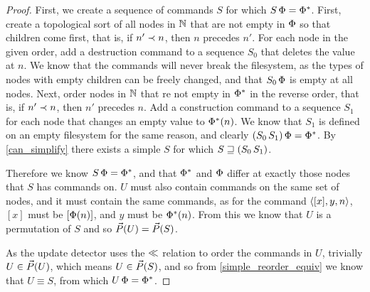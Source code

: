 \begin{proof}
First, we create a sequence of commands $S$ for which $S\,\Phi=\Phi^*$.
First, create a topological sort of all nodes in $\mathbb{N}$ that are
not empty in $\Phi$ so that children come first,
that is, if $n'\prec n$, then $n$ precedes $n'$.
For each node in the given order, add a destruction command to a sequence $S_0$
that deletes the value at $n$.
We know that the commands will never break the filesystem, as the types of nodes
with empty children can be freely changed, and that $S_0\,\Phi$ is empty at all nodes.
Next, order nodes in $\mathbb{N}$ that re not empty in $\Phi^*$ in the reverse order,
that is, if $n'\prec n$, then $n'$ precedes $n$.
Add a construction command to a sequence $S_1$ for each node that changes an empty value
to $\Phi^*(n)$.
We know that $S_1$ is defined on an empty filesystem for the same reason,
and clearly $(S_0\, S_1)\,\Phi=\Phi^*$.
By \cref{can_simplify} there exists a simple $S$ for which $S\sqsupseteq (S_0\, S_1)$.

Therefore we know $S\,\Phi=\Phi^*$, and that
$\Phi^*$ and $\Phi$ differ at exactly those nodes that $S$ has commands on.
$U$ must also contain commands on the same set of nodes,
and it must contain the same commands,
as for the command $\langle{[x],y,n}\rangle$, $[x]$ must be $[\Phi(n)]$, and $y$ must be $\Phi^*(n)$.
From this we know that $U$ is a permutation of $S$ and so $\vec{P}({U})=\vec{P}({S})$.

As the update detector uses the $\ll$ relation to order the commands in $U$, trivially $U\in\vec{P}({U})$,
which means $U\in\vec{P}({S})$,
and so from \cref{simple_reorder_equiv} we know that $U\equiv S$,
from which $U\,\Phi=\Phi^*$.
\end{proof}

